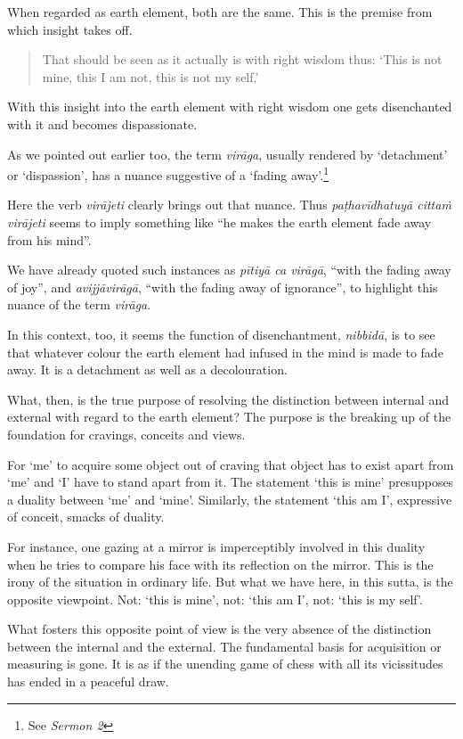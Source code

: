 When regarded as earth element, both are the same. This is the premise from which insight takes off.

\begin{quote}
That should be seen as it actually is with right wisdom thus: `This is not mine, this I am not, this is not my self.'
\end{quote}

With this insight into the earth element with right wisdom one gets disenchanted with it and becomes dispassionate.

As we pointed out earlier too, the term \emph{virāga}, usually rendered by `detachment' or `dispassion', has a nuance suggestive of a `fading away'.\footnote{See \emph{Sermon 2}}

Here the verb \emph{virājeti} clearly brings out that nuance. Thus \emph{paṭhavīdhatuyā cittaṁ virājeti} seems to imply something like ``he makes the earth element fade away from his mind''.

We have already quoted such instances as \emph{pītiyā ca virāgā}, ``with the fading away of joy'', and \emph{avijjāvirāgā}, ``with the fading away of ignorance'', to highlight this nuance of the term \emph{virāga}.

In this context, too, it seems the function of disenchantment, \emph{nibbidā}, is to see that whatever colour the earth element had infused in the mind is made to fade away. It is a detachment as well as a decolouration.

What, then, is the true purpose of resolving the distinction between internal and external with regard to the earth element? The purpose is the breaking up of the foundation for cravings, conceits and views.

For `me' to acquire some object out of craving that object has to exist apart from `me' and `I' have to stand apart from it. The statement `this is mine' presupposes a duality between `me' and `mine'. Similarly, the statement `this am I', expressive of conceit, smacks of duality.

For instance, one gazing at a mirror is imperceptibly involved in this duality when he tries to compare his face with its reflection on the mirror. This is the irony of the situation in ordinary life. But what we have here, in this sutta, is the opposite viewpoint. Not: `this is mine', not: `this am I', not: `this is my self'.

What fosters this opposite point of view is the very absence of the distinction between the internal and the external. The fundamental basis for acquisition or measuring is gone. It is as if the unending game of chess with all its vicissitudes has ended in a peaceful draw.

